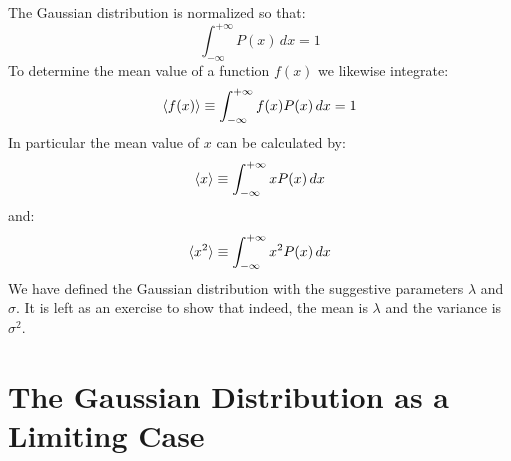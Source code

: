 \documentclass[12pt,oneside]{book}
\begin{document}
The Gaussian distribution is normalized so that:
\begin{displaymath}
\int_{-\infty}^{+\infty} P(x) \, dx = 1
\end{displaymath}
To determine the mean value of a function $f(x)$ we likewise integrate:
\begin{displaymath}
\braket{f(x)} \equiv \int_{-\infty}^{+\infty} f(x) P(x) \, dx = 1
\end{displaymath}
In particular the mean value of $x$ can be calculated by:
\begin{displaymath}
\braket{x} \equiv \int_{-\infty}^{+\infty} x P(x) \, dx 
\end{displaymath}
and:
\begin{displaymath}
\braket{x^2}  \equiv \int_{-\infty}^{+\infty} x^2 P(x) \, dx 
\end{displaymath}
We have defined the Gaussian distribution with the suggestive parameters $\lambda$ and $\sigma$.   It is left as an exercise to show that indeed, the mean is $\lambda$ and the variance is $\sigma^2$.

\section{The Gaussian Distribution as a Limiting Case}
\end{document}
